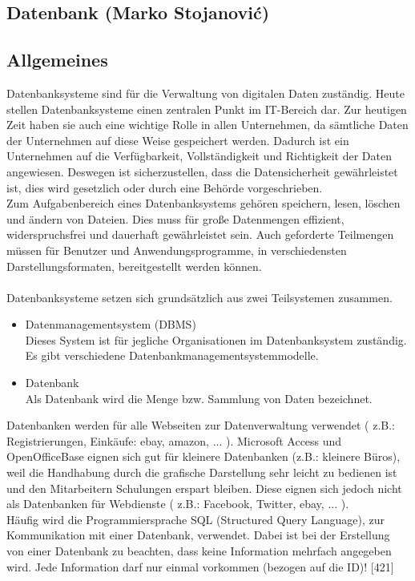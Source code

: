 \documentclass[12pt,a4paper]{report}
\begin{document}
\begin{onehalfspace}
\chapter{Datenbank (Marko Stojanovi\'{c})}
\section{Allgemeines}
Datenbanksysteme sind für die Verwaltung von digitalen Daten zuständig. Heute stellen Datenbanksysteme einen zentralen Punkt im IT-Bereich dar. Zur heutigen Zeit haben sie auch eine wichtige Rolle in allen Unternehmen, da sämtliche Daten der Unternehmen auf diese Weise gespeichert werden. Dadurch ist ein Unternehmen auf die Verfügbarkeit, Vollständigkeit und Richtigkeit der Daten angewiesen. Deswegen ist sicherzustellen, dass die Datensicherheit gewährleistet ist, dies wird gesetzlich oder durch eine Behörde vorgeschrieben.\\

Zum Aufgabenbereich eines Datenbanksystems gehören speichern, lesen, löschen und ändern von Dateien. Dies muss für große Datenmengen effizient, widerspruchsfrei und dauerhaft gewährleistet sein. Auch geforderte Teilmengen müssen für Benutzer und Anwendungsprogramme, in verschiedensten Darstellungsformaten, bereitgestellt werden können.\\
\\Datenbanksysteme setzen sich grundsätzlich aus zwei Teilsystemen zusammen.
\begin{itemize}
\item Datenmanagementsystem (DBMS)\\
Dieses System ist für jegliche Organisationen im Datenbanksystem zuständig. Es gibt verschiedene Datenbankmanagementsystemmodelle.
\item Datenbank\\
Als Datenbank wird die Menge bzw. Sammlung von Daten bezeichnet.
\end{itemize} 
Datenbanken werden für alle Webseiten zur Datenverwaltung verwendet ( z.B.: Registrierungen, Einkäufe: ebay, amazon, ... ).
Microsoft Access und OpenOfficeBase eignen sich gut für kleinere Datenbanken (z.B.: kleinere Büros), weil die Handhabung durch die grafische Darstellung sehr leicht zu bedienen ist und den Mitarbeitern Schulungen erspart bleiben.
Diese eignen sich jedoch nicht als Datenbanken für Webdienste ( z.B.: Facebook, Twitter, ebay, ... ).\\

Häufig wird die Programmiersprache SQL (Structured Query Language), zur Kommunikation mit einer Datenbank, verwendet. Dabei ist bei der Erstellung von einer Datenbank zu beachten, dass keine Information mehrfach angegeben wird. Jede Information darf nur einmal vorkommen (bezogen auf die ID)! [421]


\end{onehalfspace}
\end{document}
